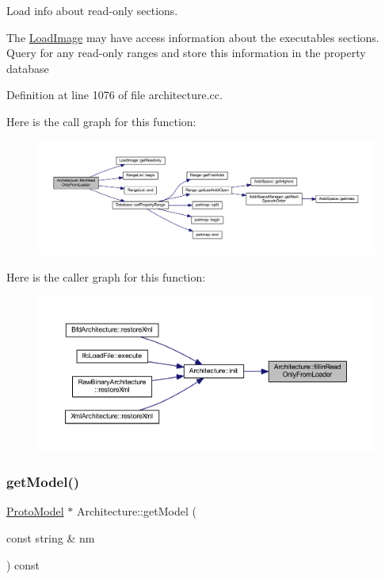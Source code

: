 Load info about read-\/only sections. 

The \mbox{\hyperlink{class_load_image}{Load\+Image}} may have access information about the executables sections. Query for any read-\/only ranges and store this information in the property database 

Definition at line 1076 of file architecture.\+cc.

Here is the call graph for this function\+:
\nopagebreak
\begin{figure}[H]
\begin{center}
\leavevmode
\includegraphics[width=350pt]{class_architecture_a74b374a6d9b25a638567c3519ac1796c_cgraph}
\end{center}
\end{figure}
Here is the caller graph for this function\+:
\nopagebreak
\begin{figure}[H]
\begin{center}
\leavevmode
\includegraphics[width=350pt]{class_architecture_a74b374a6d9b25a638567c3519ac1796c_icgraph}
\end{center}
\end{figure}
\mbox{\label{class_architecture_a03485a52fdf3b18f004ff4687d159a1e}} 
\subsubsection{\texorpdfstring{getModel()}{getModel()}}
{\footnotesize\ttfamily \mbox{\hyperlink{class_proto_model}{Proto\+Model}} $\ast$ Architecture\+::get\+Model (\begin{DoxyParamCaption}\item[{const string \&}]{nm }\end{DoxyParamCaption}) const}




